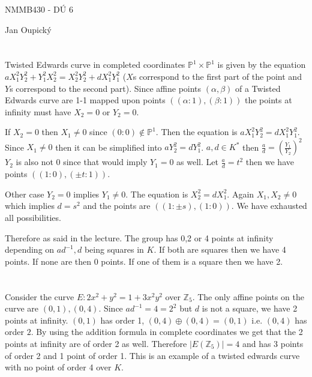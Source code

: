 \documentclass[12pt, a4paper]{article}
\begin{document}
\begin{center}
\large NMMB430 - DÚ 6

\normalsize Jan Oupický
\end{center}
\vspace{1\baselineskip}

\section{}
Twisted Edwards curve in completed coordinates $\mathbb{P}^1 \times \mathbb{P}^1$ is given by the equation $aX_1^2Y_2^2+Y_1^2X_2^2 = X_2^2Y_2^2 + dX_1^2Y_1^2$ ($X$s correspond to the first part of the point and $Y$s correspond to the second part). Since affine points $(\alpha, \beta)$ of a Twisted Edwards curve are 1-1 mapped upon points $((\alpha: 1), (\beta : 1))$ the points at infinity must have $X_2 = 0$ or $Y_2 = 0$.

If $X_2 = 0$ then $X_1 \neq 0$ since $(0:0) \notin \mathbb{P}^1$. Then the equation is $aX_1^2Y_2^2 = dX_1^2Y_1^2$. Since $X_1 \neq 0$ then it can be simplified into $aY_2^2 = dY_1^2$. $a,d \in K^*$ then $\frac{a}{d} = \left(\frac{Y_1}{Y_2}\right)^2$ $Y_2$ is also not 0 since that would imply $Y_1=0$ as well. Let $\frac{a}{d}=t^2$ then we have points $((1:0),(\pm t:1))$.

Other case $Y_2 = 0$ implies $Y_1 \neq 0$. The equation is $X_2^2 = dX_1^2$. Again $X_1,X_2 \neq 0$ which implies $d = s^2$ and the points are $((1:\pm s),(1:0))$. We have exhausted all possibilities.

Therefore as said in the lecture. The group has 0,2 or 4 points at infinity depending on $ad^{-1}, d$ being squares in $K$. If both are squares then we have 4 points. If none are then 0 points. If one of them is a square then we have 2.

\section{}
Consider the curve $E: 2x^2+y^2=1+3x^2y^2$ over $\mathbb{Z}_5$. The only affine points on the curve are $(0,1), (0,4)$. Since $ad^{-1}=4=2^2$ but $d$ is not a square, we have 2 points at infinity. $(0,1)$ has order 1, $(0,4) \oplus (0,4) = (0,1)$ i.e. $(0,4)$ has order $2$. By using the addition formula in complete coordinates we get that the 2 points at infinity are of order 2 as well. Therefore $|E(\mathbb{Z}_5)| = 4$ and has 3 points of order 2 and 1 point of order 1. This is an example of a twisted edwards curve with no point of order 4 over $K$.
\end{document}
